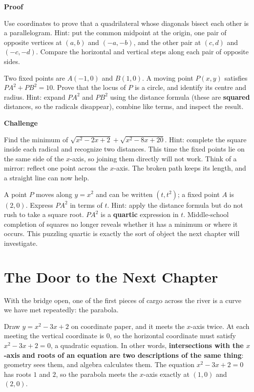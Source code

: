 \textbf{Proof}

\begin{sikao}
\item Use coordinates to prove that a quadrilateral whose diagonals bisect each other is a parallelogram. Hint: put the common midpoint at the origin, one pair of opposite vertices at $(a,b)$ and $(-a,-b)$, and the other pair at $(c,d)$ and $(-c,-d)$. Compare the horizontal and vertical steps along each pair of opposite sides.
\item Two fixed points are $A(-1,0)$ and $B(1,0)$. A moving point $P(x,y)$ satisfies $PA^{2}+PB^{2}=10$. Prove that the locus of $P$ is a circle, and identify its centre and radius. Hint: expand $PA^{2}$ and $PB^{2}$ using the distance formula (these are \textbf{squared} distances, so the radicals disappear), combine like terms, and inspect the result.
\end{sikao}

\textbf{Challenge}

\begin{sikao}
\item Find the minimum of $\sqrt{x^{2}-2x+2}+\sqrt{x^{2}-8x+20}$. Hint: complete the square inside each radical and recognize two distances. This time the fixed points lie on the same side of the $x$-axis, so joining them directly will not work. Think of a mirror: reflect one point across the $x$-axis. The broken path keeps its length, and a straight line can now help.
\item A point $P$ moves along $y=x^{2}$ and can be written $(t,t^{2})$; a fixed point $A$ is $(2,0)$. Express $PA^{2}$ in terms of $t$. Hint: apply the distance formula but do not rush to take a square root. $PA^{2}$ is a \textbf{quartic} expression in $t$. Middle-school completion of squares no longer reveals whether it has a minimum or where it occurs. This puzzling quartic is exactly the sort of object the next chapter will investigate.
\end{sikao}

\section*{The Door to the Next Chapter}

With the bridge open, one of the first pieces of cargo across the river is a curve we have met repeatedly: the parabola.

Draw $y=x^{2}-3x+2$ on coordinate paper, and it meets the $x$-axis twice. At each meeting the vertical coordinate is $0$, so the horizontal coordinate must satisfy $x^{2}-3x+2=0$, a quadratic equation. In other words, \textbf{intersections with the $x$-axis and roots of an equation are two descriptions of the same thing}: geometry sees them, and algebra calculates them. The equation $x^{2}-3x+2=0$ has roots $1$ and $2$, so the parabola meets the $x$-axis exactly at $(1,0)$ and $(2,0)$.

